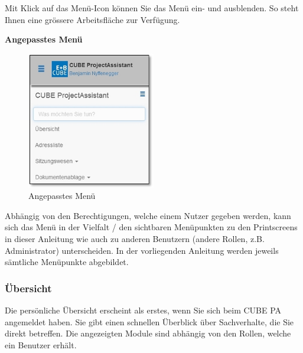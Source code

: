 \vspace{\baselineskip}

Mit Klick auf das Menü-Icon  können Sie das Menü ein- und ausblenden. So steht Ihnen eine grössere Arbeitsfläche zur Verfügung.

\vspace{6.5cm}  

\textbf{Angepasstes Menü}

\begin{figure}
\vspace{-35pt}
\includegraphics[height=60mm]{../chapters/01_Einfuehrung/pictures/1-3-1_MenuAngepasst.jpg}
\caption{Angepasstes Menü}
\end{figure}

Abhängig von den Berechtigungen, welche einem Nutzer gegeben werden, kann sich das Menü in der Vielfalt / den sichtbaren Menüpunkten zu den Printscreens in dieser Anleitung wie auch zu anderen Benutzern (andere Rollen, z.B. Administrator) unterscheiden. In der vorliegenden Anleitung werden jeweils sämtliche Menüpunkte abgebildet.

\subsubsection{Übersicht}
\label{bkm:Ref132000001}
Die persönliche Übersicht erscheint als erstes, wenn Sie sich beim CUBE PA angemeldet haben. Sie gibt einen schnellen Überblick über Sachverhalte, die Sie direkt betreffen. Die angezeigten Module sind abhängig von den Rollen, welche ein Benutzer erhält.

